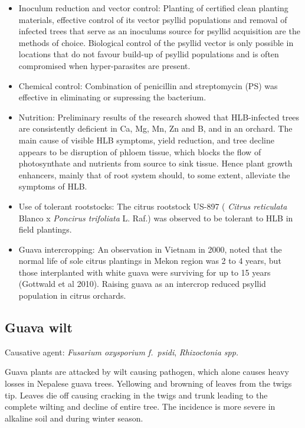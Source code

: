 \documentclass[
  openany]{book}
\begin{document}
\begin{itemize}
\item
  Inoculum reduction and vector control: Planting of certified clean planting materials, effective control of its vector psyllid populations and removal of infected trees that serve as an inoculums source for psyllid acquisition are the methods of choice. Biological control of the psyllid vector is only possible in locations that do not favour build-up of psyllid populations and is often compromised when hyper-parasites are present.
\item
  Chemical control: Combination of penicillin and streptomycin (PS) was effective in eliminating or supressing the bacterium.
\item
  Nutrition: Preliminary results of the research showed that HLB-infected trees are consistently deficient in Ca, Mg, Mn, Zn and B, and in an orchard. The main cause of visible HLB symptoms, yield reduction, and tree decline appears to be disruption of phloem tissue, which blocks the flow of photosynthate and nutrients from source to sink tissue. Hence plant growth enhancers, mainly that of root system should, to some extent, alleviate the symptoms of HLB.
\item
  Use of tolerant rootstocks: The citrus rootstock US-897 ( \emph{Citrus reticulata} Blanco x \emph{Poncirus trifoliata} L. Raf.) was observed to be tolerant to HLB in field plantings.
\item
  Guava intercropping: An observation in Vietnam in 2000, noted that the normal life of sole citrus plantings in Mekon region was 2 to 4 years, but those interplanted with white guava were surviving for up to 15 years (Gottwald et al 2010). Raising guava as an intercrop reduced psyllid population in citrus orchards.
\end{itemize}

\hypertarget{guava-wilt}{%
\subsection{Guava wilt}\label{guava-wilt}}

Causative agent: \emph{Fusarium oxysporium f.~psidi}, \emph{Rhizoctonia spp.}

Guava plants are attacked by wilt causing pathogen, which alone causes heavy losses in Nepalese guava trees. Yellowing and browning of leaves from the twigs tip. Leaves die off causing cracking in the twigs and trunk leading to the complete wilting and decline of entire tree. The incidence is more severe in alkaline soil and during winter season.
\end{document}
